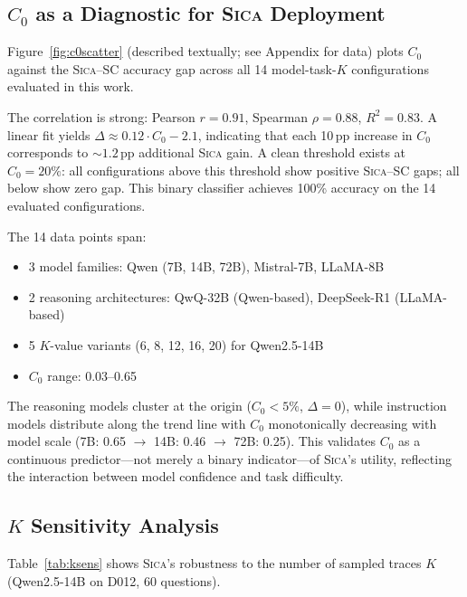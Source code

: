 \documentclass[11pt,a4paper]{article}
\newcommand{\sica}{\textsc{Sica}}
\newcommand{\czero}{C_0}
\begin{document}
\subsection{$\czero{}$ as a Diagnostic for \sica{} Deployment}
\label{sec:c0}

Figure~\ref{fig:c0scatter} (described textually; see Appendix for data) plots $\czero{}$ against the \sica{}--SC accuracy gap across all 14 model-task-$K$ configurations evaluated in this work.

The correlation is strong: Pearson $r{=}0.91$, Spearman $\rho{=}0.88$, $R^2{=}0.83$.
A linear fit yields $\Delta \approx 0.12 \cdot \czero{} - 2.1$, indicating that each 10\,pp increase in $\czero{}$ corresponds to ${\sim}1.2$\,pp additional \sica{} gain.
A clean threshold exists at $\czero{}{=}20\%$: all configurations above this threshold show positive \sica{}--SC gaps; all below show zero gap.
This binary classifier achieves 100\% accuracy on the 14 evaluated configurations.

The 14 data points span:
\begin{itemize}[nosep,leftmargin=*]
  \item 3 model families: Qwen (7B, 14B, 72B), Mistral-7B, LLaMA-8B
  \item 2 reasoning architectures: QwQ-32B (Qwen-based), DeepSeek-R1 (LLaMA-based)
  \item 5 $K$-value variants (6, 8, 12, 16, 20) for Qwen2.5-14B
  \item $\czero{}$ range: 0.03--0.65
\end{itemize}

The reasoning models cluster at the origin ($\czero{}<5\%$, $\Delta{=}0$), while instruction models distribute along the trend line with $\czero{}$ monotonically decreasing with model scale (7B: 0.65 $\to$ 14B: 0.46 $\to$ 72B: 0.25).
This validates $\czero{}$ as a continuous predictor---not merely a binary indicator---of \sica{}'s utility, reflecting the interaction between model confidence and task difficulty.


\subsection{$K$ Sensitivity Analysis}
\label{sec:ksensitivity}

Table~\ref{tab:ksens} shows \sica{}'s robustness to the number of sampled traces $K$ (Qwen2.5-14B on D012, 60 questions).
\end{document}
